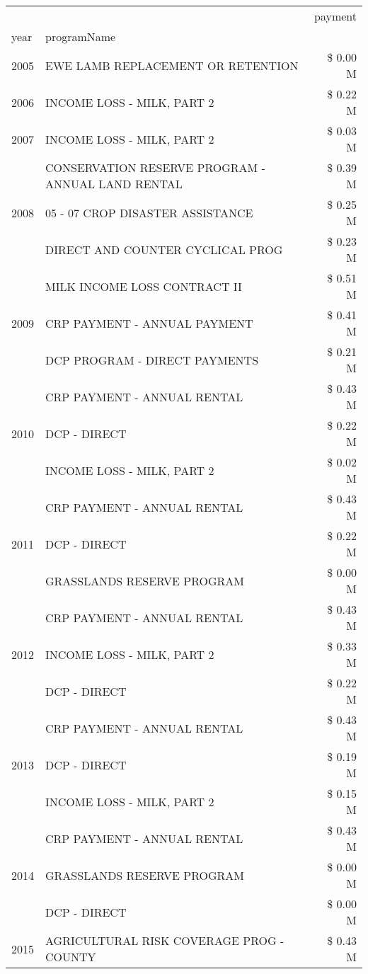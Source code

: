 \begin{tabular}{llr}
\toprule
 &  & payment \\
year & programName &  \\
\midrule
2005 & EWE LAMB REPLACEMENT OR RETENTION & \$ 0.00 M \\
\cline{1-3}
2006 & INCOME LOSS - MILK, PART 2 & \$ 0.22 M \\
\cline{1-3}
2007 & INCOME LOSS - MILK, PART 2 & \$ 0.03 M \\
\cline{1-3}
\multirow[t]{3}{*}{2008} & CONSERVATION RESERVE PROGRAM - ANNUAL LAND RENTAL & \$ 0.39 M \\
 & 05 - 07 CROP DISASTER ASSISTANCE & \$ 0.25 M \\
 & DIRECT AND COUNTER CYCLICAL PROG & \$ 0.23 M \\
\cline{1-3}
\multirow[t]{3}{*}{2009} & MILK INCOME LOSS CONTRACT II & \$ 0.51 M \\
 & CRP PAYMENT - ANNUAL PAYMENT & \$ 0.41 M \\
 & DCP PROGRAM - DIRECT PAYMENTS & \$ 0.21 M \\
\cline{1-3}
\multirow[t]{3}{*}{2010} & CRP PAYMENT - ANNUAL RENTAL & \$ 0.43 M \\
 & DCP - DIRECT & \$ 0.22 M \\
 & INCOME LOSS - MILK, PART 2 & \$ 0.02 M \\
\cline{1-3}
\multirow[t]{3}{*}{2011} & CRP PAYMENT - ANNUAL RENTAL & \$ 0.43 M \\
 & DCP - DIRECT & \$ 0.22 M \\
 & GRASSLANDS RESERVE PROGRAM & \$ 0.00 M \\
\cline{1-3}
\multirow[t]{3}{*}{2012} & CRP PAYMENT - ANNUAL RENTAL & \$ 0.43 M \\
 & INCOME LOSS - MILK, PART 2 & \$ 0.33 M \\
 & DCP - DIRECT & \$ 0.22 M \\
\cline{1-3}
\multirow[t]{3}{*}{2013} & CRP PAYMENT - ANNUAL RENTAL & \$ 0.43 M \\
 & DCP - DIRECT & \$ 0.19 M \\
 & INCOME LOSS - MILK, PART 2 & \$ 0.15 M \\
\cline{1-3}
\multirow[t]{3}{*}{2014} & CRP PAYMENT - ANNUAL RENTAL & \$ 0.43 M \\
 & GRASSLANDS RESERVE PROGRAM & \$ 0.00 M \\
 & DCP - DIRECT & \$ 0.00 M \\
\cline{1-3}
\multirow[t]{3}{*}{2015} & AGRICULTURAL RISK COVERAGE PROG - COUNTY & \$ 0.43 M \\

\end{tabular}
